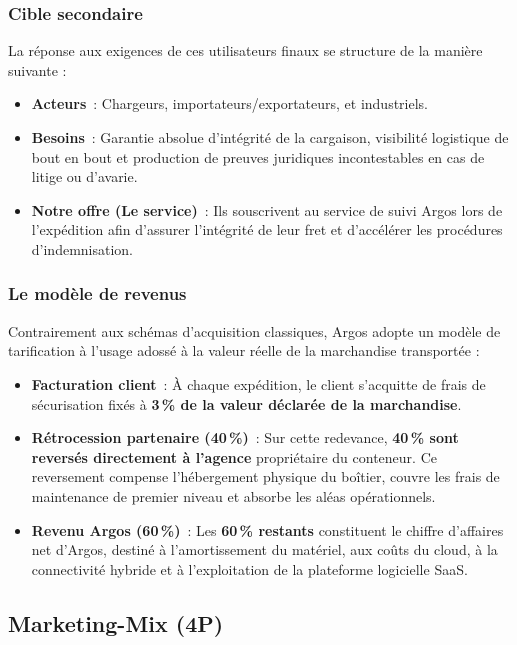 \subsubsection{Cible secondaire}
La réponse aux exigences de ces utilisateurs finaux se structure de la manière suivante :
\begin{itemize}[label=\textcolor{argosblue}{\textbf{>}}]
    \item \textbf{Acteurs}~: Chargeurs, importateurs/exportateurs, et industriels.
    \item \textbf{Besoins}~: Garantie absolue d’intégrité de la cargaison, visibilité logistique de bout en bout et production de preuves juridiques incontestables en cas de litige ou d’avarie.
    \item \textbf{Notre offre (Le service)}~: Ils souscrivent au service de suivi Argos lors de l’expédition afin d'assurer l’intégrité de leur fret et d'accélérer les procédures d'indemnisation.
\end{itemize}

\subsubsection{Le modèle de revenus}
Contrairement aux schémas d'acquisition classiques, Argos adopte un modèle de tarification à l'usage adossé à la valeur réelle de la marchandise transportée :
\begin{itemize}[label=\textcolor{argosblue}{\textbf{>}}]
    \item \textbf{Facturation client}~: À chaque expédition, le client s’acquitte de frais de sécurisation fixés à \textbf{3\,\% de la valeur déclarée de la marchandise}.
    \item \textbf{Rétrocession partenaire (40\,\%)}~: Sur cette redevance, \textbf{40\,\% sont reversés directement à l'agence} propriétaire du conteneur. Ce reversement compense l'hébergement physique du boîtier, couvre les frais de maintenance de premier niveau et absorbe les aléas opérationnels.
    \item \textbf{Revenu Argos (60\,\%)}~: Les \textbf{60\,\% restants} constituent le chiffre d’affaires net d’Argos, destiné à l’amortissement du matériel, aux coûts du cloud, à la connectivité hybride et à l'exploitation de la plateforme logicielle SaaS.
\end{itemize}

\subsection{Marketing-Mix (4P)}

